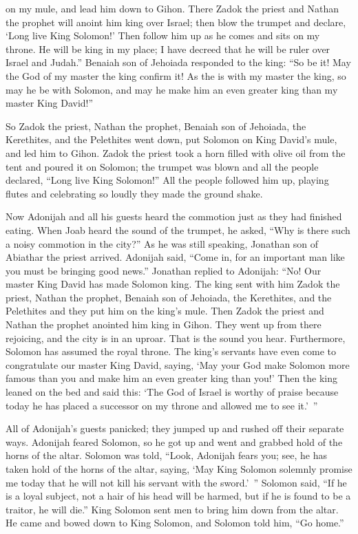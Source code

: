 {on
my mule,
and lead him down
to
Gihon.
There
Zadok
the priest
and Nathan
the prophet
will anoint
him king
over
Israel;
then blow
the trumpet
and declare,
‘Long live
King
Solomon!’
Then follow
him up
as he comes
and sits
on
my throne.
He
will be king
in my place;
I have decreed
that he will be
ruler
over
Israel
and Judah.”
Benaiah
son
of Jehoiada
responded
to the king: “So be it! May
the {}
God
of my master
the king
confirm it!
As
the {}
is with
my master
the king,
so
may he be
with
Solomon,
and may he make him an even greater
king
than
my master
King
David!”
\par }{\PP {}So Zadok
the priest,
Nathan
the prophet,
Benaiah
son
of Jehoiada,
the Kerethites,
and the Pelethites
went down,
put
Solomon
on
King
David’s
mule,
and led
him to Gihon.
Zadok
the priest
took
a horn
filled with olive oil
from
the tent
and poured
it on Solomon;
the trumpet
was blown and all
the people
declared, “Long live
King
Solomon!”
All
the people
followed
him up,
playing
flutes
and celebrating
so loudly
they made the ground
shake.
\par }{\PP {}Now Adonijah
and all
his guests
heard
the commotion
just as
they
had finished
eating.
When
Joab
heard
the
sound
of the trumpet,
he asked,
“Why
is there such a noisy commotion
in the city?”
As he was still
speaking,
Jonathan
son
of Abiathar
the priest
arrived.
Adonijah
said,
“Come
in, for
an important
man
like you
must be bringing good news.”
Jonathan
replied
to Adonijah: “No! Our master
King
David
has made
Solomon king.
The king
sent
with
him Zadok
the priest,
Nathan
the prophet,
Benaiah
son
of Jehoiada,
the Kerethites,
and the Pelethites
and they put
him on
the king’s
mule.
Then Zadok
the priest
and Nathan
the prophet
anointed
him king
in Gihon.
They went up
from there
rejoicing,
and the city
is in an uproar. That is
the sound
you hear.
Furthermore,
Solomon
has assumed the royal
throne.
The king’s
servants
have even
come
to congratulate
our master
King
David,
saying,
‘May your God
make Solomon
more famous
than you and make him an even greater
king
than you!’ Then the king
leaned
on
the bed
and said
this: ‘The
{}
God
of Israel
is worthy of praise
because today
he has
placed
a successor
on
my throne
and allowed
me to see it.’ ”
\par }{\PP {}All
of Adonijah’s
guests
panicked;
they jumped up
and rushed off their separate ways.
Adonijah
feared
Solomon,
so he got
up and went
and grabbed
hold of the horns
of the altar.
Solomon
was told,
“Look,
Adonijah
fears
you; see,
he has taken hold
of the horns
of the altar,
saying,
‘May King
Solomon
solemnly promise
me today
that he will not
kill
his servant
with the sword.’ ”
Solomon
said,
“If
he is a loyal subject, not
a hair of his head
will be harmed, but if
he is found
to be a traitor, he will die.”
King
Solomon
sent
men to bring him down
from the altar.
He came
and bowed
down to King
Solomon,
and Solomon
told
him, “Go
home.”

}
